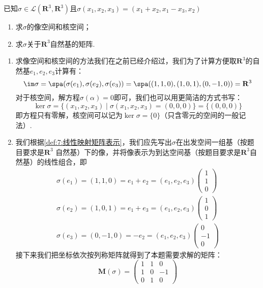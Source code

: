 \begin{example}\label{ex:7:矩阵表示1}
    已知$\sigma \in \mathcal{L}(\mathbf{R}^3,\mathbf{R}^3)$且$\sigma(x_1,x_2,x_3)=(x_1+x_2,x_1-x_3, x_2)$
    \begin{enumerate}[label=(\arabic*)]
        \item 求$\sigma$的像空间和核空间；

        \item 求$\sigma$关于$\mathbf{R}^3$自然基的矩阵.
    \end{enumerate}
\end{example}
\begin{solution}
    \begin{enumerate}[label=(\arabic*)]
        \item 求像空间和核空间的方法我们在之前已经介绍过，我们为了计算方便取$\mathbf{R}^3$的自然基$e_1,e_2,e_3$计算有：
        \[\im\sigma=\spa(\sigma(e_1),\sigma(e_2),\sigma(e_3))=\spa((1,1,0),(1,0,1),(0,-1,0))=\mathbf{R}^3\]
        对于核空间，解方程$\sigma(\alpha)=0$即可，我们也可以用更简洁的方式书写：
        \[\ker\sigma=\{(x_1,x_2,x_3)\mid \sigma(x_1,x_2,x_3)=(0,0,0)\}=\{(0,0,0)\}\]
        即方程只有零解，核空间可以记为$\ker\sigma=\{0\}$（只含零元的空间的一般记法）.
        \item 我们根据\autoref{def:7:线性映射矩阵表示}，我们应先写出$\sigma$在出发空间一组基（按题目要求是$\mathbf{R}^3$
        自然基）下的像，并将像表示为到达空间基（按题目要求是$\mathbf{R}^3$自然基）的线性组合，即
        \begin{gather*}
            \sigma(e_1)=(1,1,0)=e_1+e_2=(e_1,e_2,e_3)\begin{pmatrix}
                1 \\ 1 \\ 0
            \end{pmatrix} \\
            \sigma(e_2)=(1,0,1)=e_1+e_3=(e_1,e_2,e_3)\begin{pmatrix}
                1 \\ 0 \\ 1
            \end{pmatrix} \\
            \sigma(e_3)=(0,-1,0)=-e_2=(e_1,e_2,e_3)\begin{pmatrix}
                0 \\ -1 \\ 0
            \end{pmatrix}
        \end{gather*}
        接下来我们把坐标依次按列称矩阵就得到了本题需要求解的矩阵：
        \[\mathbf{M}(\sigma)=\begin{pmatrix}
            1 & 1 & 0 \\
            1 & 0 & -1 \\
            0 & 1 & 0
        \end{pmatrix}\]
    \end{enumerate}
\end{solution}

